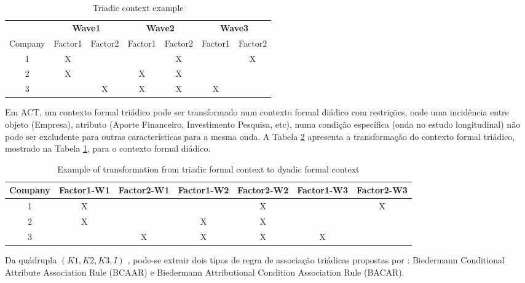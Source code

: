 \documentclass[kdmile,a4paper]{kdmile} %
\begin{document}
\begin{table}[h!] 
\scriptsize
\begin{center}
\caption{Triadic context example} \label{Tabela:1}
\begin{tabular}{c|cc|cc|cc} \hline
&\multicolumn{2}{c|}{\textbf{Wave1}}&\multicolumn{2}{c|}{\textbf{Wave2}}&\multicolumn{2}{c}{\textbf{Wave3}}
\\ Company &Factor1&Factor2&Factor1&Factor2&Factor1&Factor2\\
\hline
1   & X &  
    &   & X
    &   & X \\
2   & X &  
    & X & X
    &   &   \\
3   &   & X 
    & X & X
    & X &   \\
    \hline
\end{tabular}
\end{center}
\end{table}

Em ACT, um contexto formal triádico pode ser transformado num contexto formal diádico com restrições, onde uma incidência entre objeto (Empresa), atributo (Aporte Financeiro, Investimento Pesquisa, etc), numa condição específica (onda no estudo longitudinal) não pode ser excludente para outras características para a mesma onda. A Tabela \ref{Tabela:1b} apresenta a transformação do contexto formal triádico, mostrado na Tabela \ref{Tabela:1}, para o contexto formal diádico.

\begin{table}[h!] 
\scriptsize
\begin{center}
\caption{Example of transformation from triadic formal context to dyadic formal context} \label{Tabela:1b}
\begin{tabular}{c|cc|cc|cc} 
\hline
Company &Factor1-W1&Factor2-W1&Factor1-W2&Factor2-W2&Factor1-W3&Factor2-W3\\
\hline
1   & X &  
    &   & X
    &   & X \\
2   & X &  
    & X & X
    &   &   \\
3   &   & X 
    & X & X
    & X &   \\
    \hline
\end{tabular}
\end{center}
\end{table}

Da quádrupla $(K1, K2, K3, I)$ , pode-se extrair dois tipos de regra de associação triádicas propostas por \cite{biedermann:97}: Biedermann Conditional Attribute Association Rule (BCAAR) e Biedermann Attributional Condition Association Rule (BACAR).
\end{document}
